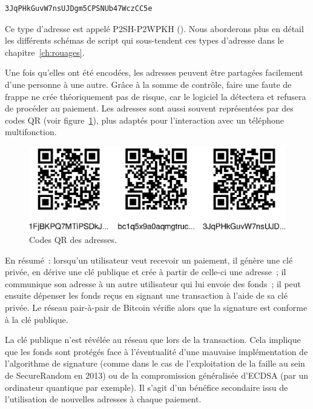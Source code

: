 \begin{Verbatim}[fontsize=\small]
3JqPHkGuvW7nsUJDgm5CPSNUb47WczCC5e
\end{Verbatim}

Ce type d'adresse est appelé P2SH-P2WPKH (). Nous aborderons plus en détail les différents schémas de script qui sous-tendent ces types d'adresse dans le chapitre~\ref{ch:rouages}.

Une fois qu'elles ont été encodées, les adresses peuvent être partagées facilement d'une personne à une autre. Grâce à la somme de contrôle, faire une faute de frappe ne crée théoriquement pas de risque, car le logiciel la détectera et refusera de procéder au paiement. Les adresses sont aussi souvent représentées par des codes QR (voir figure~\ref{fig:address-qr-codes}), plus adaptés pour l'interaction avec un téléphone multifonction.

\begin{figure}[h]
  \centering
  \includegraphics[scale=0.7]{img/address-qr-codes.eps}
  \caption{Codes QR des adresses.}
  \label{fig:address-qr-codes}
\end{figure}

En résumé~: lorsqu'un utilisateur veut recevoir un paiement, il génère une clé privée, en dérive une clé publique et crée à partir de celle-ci une adresse~; il communique son adresse à un autre utilisateur qui lui envoie des fonds~; il peut ensuite dépenser les fonds reçus en signant une transaction à l'aide de sa clé privée. Le réseau pair-à-pair de Bitcoin vérifie alors que la signature est conforme à la clé publique. 

La clé publique n'est révélée au réseau que lors de la transaction. Cela implique que les fonds sont protégés face à l'éventualité d'une mauvaise implémentation de l'algorithme de signature (comme dans le cas de l'exploitation de la faille au sein de SecureRandom en 2013) ou de la compromission généralisée d'ECDSA (par un ordinateur quantique par exemple). Il s'agit d'un bénéfice secondaire issu de l'utilisation de nouvelles adresses à chaque paiement.

